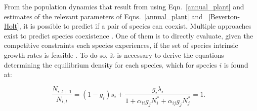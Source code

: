 \begin{refsection}
From the population dynamics that result from using Eqn.~\ref{annual_plant} and estimates of the relevant parameters of Eqns.~\ref{annual_plant} and ~\ref{Beverton-Holt},  it is possible to predict if a pair of species can coexist. Multiple approaches exist to predict species coexistence \citep{chesson_general_2000, chesson_updates_2018, barabas_chessons_2018, saavedra2017structural, letten_linking_2017}. One of them is to directly evaluate, given the competitive constraints each species experiences, if the set of species intrinsic growth rates is feasible \citep[i.e., if there exists an equilibrium point under which both species have positive abundances;][]{rohr_structural_2014, saavedra2017structural}. To do so, it is necessary to derive the equations determining the equilibrium density for each species, which for species $i$ is found at:

\begin{equation}
\label{equilbrium}
  \frac{N_{i,t+1}}{N_{i,t}}  = (1-g_{i})s_{i} + \frac{g_{i}\lambda_{i}}{1 + \alpha_{ii}g_{j}N_{i}^{*} + \alpha_{ij}g_{j}N_{j}^{*}}  = 1 .
\end{equation}


\end{refsection}
